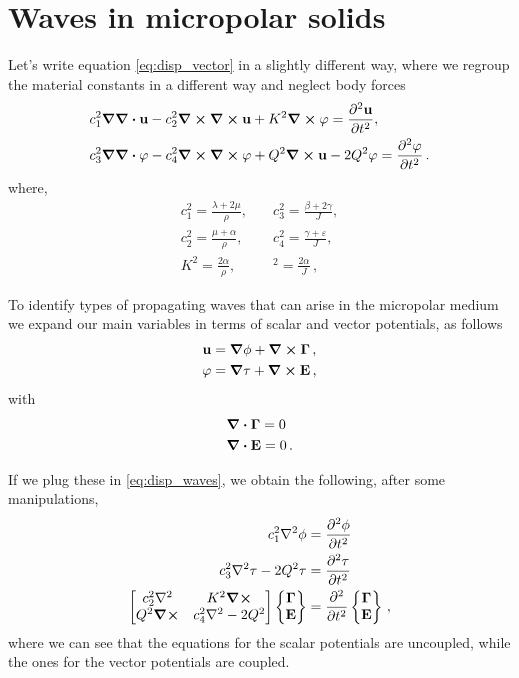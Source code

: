 \documentclass[12pt]{article}
\begin{document}
\section{Waves in micropolar solids}
Let's write equation \eqref{eq:disp_vector} in a slightly different way, where we regroup the material constants in a different way and neglect body forces
\begin{subequations}
  \begin{align}\label{eq:disp_waves}
    & c_1^2 \grad\div\vb{u} - c_2^2\curl\curl\vb{u} + K^2 \curl\vb{\varphi} =  \pdv[2]{\vb{u}}{t}, \\
    & c_3^2 \grad\div\vb{\varphi} - c_4^2 \curl\curl\vb{\varphi} +  Q^2 \curl\vb{u} - 2Q^2 \vb{\varphi} = \pdv[2]{\vb{\varphi}}{t}\, .
  \end{align}
\end{subequations}
where,
\begin{equation*}
\begin{split}
c_1^2 = \frac{\lambda +2\mu}{\rho},\quad &c_3^2 =\frac{\beta +2\gamma}{J},\\
c_2^2 = \frac{\mu +\alpha}{\rho},\quad &c_4^2 =\frac{\gamma + \varepsilon}{J},\\
K^2= \frac{2\alpha}{\rho},\quad &^2 =\frac{2\alpha}{J} \, ,
\end{split}
\end{equation*}


To identify types of propagating waves that can arise in the micropolar medium we expand our main variables in terms of scalar and vector potentials, as follows
\begin{align*}
\vb{u} &= \grad \phi + \curl\vb{\Gamma}\, ,\\
\vb{\varphi} &= \grad \tau + \curl\vb{E}\, ,
\end{align*}
with
\begin{align*}
&\div\vb{\Gamma} = 0\\
&\div\vb{E} = 0\, .
\end{align*}

If we plug these in \eqref{eq:disp_waves}, we obtain the following, after some manipulations,
\begin{subequations}
  \begin{align}\label{eq:potential_waves}
    c_1^2 \laplacian\phi &= \pdv[2]{\phi}{t}\\
    c_3^2 \laplacian\tau - 2Q^2\tau &= \pdv[2]{\tau}{t}\\
    \begin{bmatrix}
      c_2^2\laplacian &K^2\curl\\
      Q^2\curl &c_4^2\laplacian - 2Q^2
    \end{bmatrix}
    \begin{Bmatrix} \vb{\Gamma}\\ \vb{E}\end{Bmatrix} &=
    \pdv[2]{t} \begin{Bmatrix} \vb{\Gamma}\\ \vb{E}\end{Bmatrix}\, ,
  \end{align}
\end{subequations}
where we can see that the equations for the scalar potentials are uncoupled, while the ones
for the vector potentials are coupled.
\end{document}

